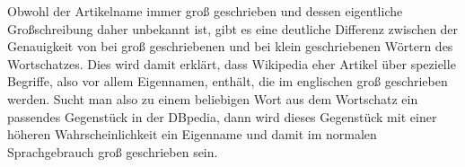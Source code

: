 Obwohl der Artikelname immer groß geschrieben und dessen eigentliche Großschreibung daher unbekannt ist,
gibt es eine deutliche Differenz zwischen der Genauigkeit von  bei groß geschriebenen und  bei klein geschriebenen Wörtern des Wortschatzes.
Dies wird damit erklärt, dass Wikipedia eher Artikel über spezielle Begriffe, also vor allem Eigennamen, enthält, die im englischen groß geschrieben werden.
Sucht man also zu einem beliebigen Wort aus dem Wortschatz ein passendes Gegenstück in der DBpedia, dann wird dieses Gegenstück mit einer höheren Wahrscheinlichkeit ein Eigenname und damit 
im normalen Sprachgebrauch groß geschrieben sein.

